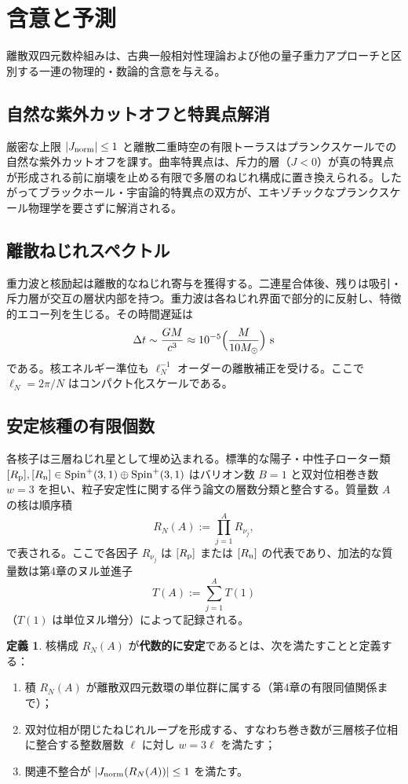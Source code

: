 \documentclass[dvipdfmx,a4paper]{article}
\theoremstyle{definition}
\newtheorem{definition}[theorem]{定義}
\theoremstyle{remark}
\newcommand{\Jnorm}{J_{\rm norm}}
\begin{document}
\section{含意と予測}

離散双四元数枠組みは、古典一般相対性理論および他の量子重力アプローチと区別する一連の物理的・数論的含意を与える。

\subsection{自然な紫外カットオフと特異点解消}

厳密な上限 $|\Jnorm| \leq 1$ と離散二重時空の有限トーラスはプランクスケールでの自然な紫外カットオフを課す。曲率特異点は、斥力的層（$J < 0$）が真の特異点が形成される前に崩壊を止める有限で多層のねじれ構成に置き換えられる。したがってブラックホール・宇宙論的特異点の双方が、エキゾチックなプランクスケール物理学を要さずに解消される。

\subsection{離散ねじれスペクトル}

重力波と核励起は離散的なねじれ寄与を獲得する。二連星合体後、残りは吸引・斥力層が交互の層状内部を持つ。重力波は各ねじれ界面で部分的に反射し、特徴的エコー列を生じる。その時間遅延は
\[
\Delta t \sim \frac{GM}{c^3} \approx 10^{-5} \Bigl( \frac{M}{10 M_\odot} \Bigr) \text{ s}
\]
である。核エネルギー準位も $\ell_N^{-1}$ オーダーの離散補正を受ける。ここで $\ell_N = 2\pi / N$ はコンパクト化スケールである。

\subsection{安定核種の有限個数}

各核子は三層ねじれ星として埋め込まれる。標準的な陽子・中性子ローター類 $[R_{\rm p}], [R_{\rm n}] \in \mathrm{Spin}^+(3,1) \oplus \mathrm{Spin}^+(3,1)$ はバリオン数 $B=1$ と双対位相巻き数 $w=3$ を担い、粒子安定性に関する伴う論文の層数分類と整合する。質量数 $A$ の核は順序積
\[
R_N(A) := \prod_{j=1}^{A} R_{\nu_j},
\]
で表される。ここで各因子 $R_{\nu_j}$ は $[R_{\rm p}]$ または $[R_{\rm n}]$ の代表であり、加法的な質量数は第4章のヌル並進子
\[
T(A) := \sum_{j=1}^{A} T(1)
\]
（$T(1)$ は単位ヌル増分）によって記録される。

\begin{definition}
核構成 $R_N(A)$ が\textbf{代数的に安定}であるとは、次を満たすことと定義する：
\begin{enumerate}[label=(\roman*)]
  \item 積 $R_N(A)$ が離散双四元数環の単位群に属する（第4章の有限同値関係まで）；
  \item 双対位相が閉じたねじれループを形成する、すなわち巻き数が三層核子位相に整合する整数層数 $\ell$ に対し $w = 3\ell$ を満たす；
  \item 関連不整合が $|\Jnorm(R_N(A))| \leq 1$ を満たす。
\end{enumerate}
\end{definition}
\end{document}
